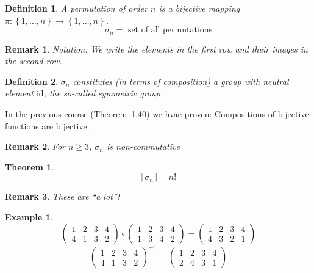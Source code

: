 \documentclass[a4paper,landscape,twocolumn]{article}
\newcommand\set[1]{\left\{#1\right\}}
\newcommand\card[1]{\left|\,#1\,\right|}
\newtheorem{theorem}{Theorem}
\newtheorem{defi}{Definition}
\newtheorem{ex}{Example}
\newtheorem{rem}{Remark}
\begin{document}
\begin{defi}
  \label{defi-7.8}
  A permutation of order $n$ is a bijective mapping $\pi: \set{1, \ldots, n} \to \set{1, \ldots, n}$.
  \[ \sigma_n = \text{ set of all permutations} \]
\end{defi}
\begin{rem}
  Notation:
  We write the elements in the first row and their images in the second row.
\end{rem}
\begin{defi}
  \label{defi-7.9}
  $\sigma_n$ constitutes (in terms of composition) a group with neutral element $\text{id}$,
  the so-called symmetric group.
\end{defi}

In the previous course (Theorem~1.40) we hvae proven: Compositions of bijective functions are bijective.
\begin{rem}
  For $n \geq 3$, $\sigma_n$ is non-commutative
\end{rem}
\begin{theorem}
  \label{satz-7.10}
  \[ \card{\sigma_n} = n! \]
\end{theorem}
\begin{rem}
  These are \enquote{a lot}!
\end{rem}
\begin{ex}
  \label{example-7.11}
  \[
    \begin{pmatrix}
      1 & 2 & 3 & 4 \\
      4 & 1 & 3 & 2
    \end{pmatrix} \circ \begin{pmatrix}
      1 & 2 & 3 & 4 \\
      1 & 3 & 4 & 2
    \end{pmatrix}
    = \begin{pmatrix}
      1 & 2 & 3 & 4 \\
      4 & 3 & 2 & 1
    \end{pmatrix}
  \] \[
    \begin{pmatrix}
      1 & 2 & 3 & 4 \\
      4 & 1 & 3 & 2
    \end{pmatrix}^{-1}
    = \begin{pmatrix}
      1 & 2 & 3 & 4 \\
      2 & 4 & 3 & 1
    \end{pmatrix}
  \]
\end{ex}
\end{document}

